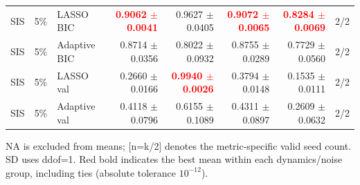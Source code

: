 \documentclass{article}
\begin{document}
\begin{longtable}{lllrrrrr}
SIS & 5\% & LASSO BIC & \textcolor{red}{\textbf{0.9062 $\pm$ 0.0041}} & 0.9627 $\pm$ 0.0405 & \textcolor{red}{\textbf{0.9072 $\pm$ 0.0065}} & \textcolor{red}{\textbf{0.8284 $\pm$ 0.0069}} & 2/2 \\
SIS & 5\% & Adaptive BIC & 0.8714 $\pm$ 0.0356 & 0.8022 $\pm$ 0.0932 & 0.8755 $\pm$ 0.0289 & 0.7729 $\pm$ 0.0560 & 2/2 \\
SIS & 5\% & LASSO val & 0.2660 $\pm$ 0.0166 & \textcolor{red}{\textbf{0.9940 $\pm$ 0.0026}} & 0.3794 $\pm$ 0.0148 & 0.1535 $\pm$ 0.0111 & 2/2 \\
SIS & 5\% & Adaptive val & 0.4118 $\pm$ 0.0796 & 0.6155 $\pm$ 0.1089 & 0.4311 $\pm$ 0.0897 & 0.2609 $\pm$ 0.0632 & 2/2 \\
\end{longtable}
\noindent NA is excluded from means; [n=k/2] denotes the metric-specific valid seed count. 
SD uses ddof=1. Red bold indicates the best mean within each dynamics/noise group, including ties (absolute tolerance $10^{-12}$).
\clearpage
\end{document}
